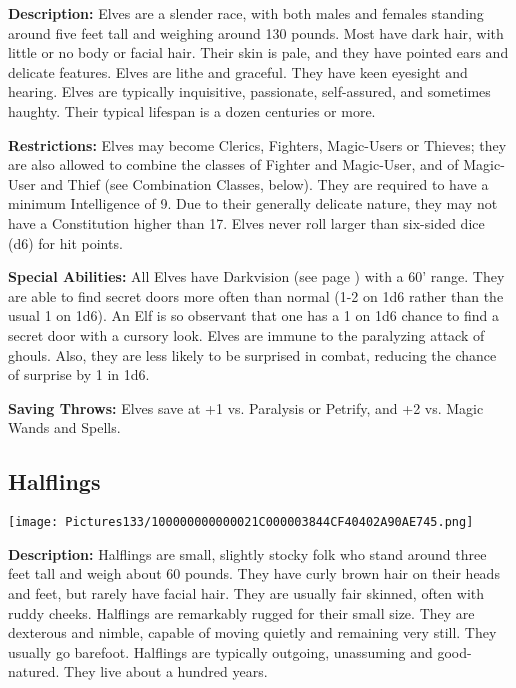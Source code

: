 \documentclass[a4paper,twoside,openany,10pt]{book}
\begin{document}
\begin{multicols}{2}
\textbf{Description:}
Elves are a slender race, with both males and females standing around five feet tall and weighing around 130 pounds. Most have dark hair, with little or no body or facial hair. Their skin is pale, and they have pointed ears and delicate features. Elves are lithe and graceful. They have keen eyesight and hearing. Elves are typically inquisitive, passionate, self-assured, and sometimes haughty. Their typical lifespan is a dozen centuries or more.

\textbf{Restrictions: } Elves may become Clerics, Fighters, Magic-Users or Thieves; they are also allowed to combine the classes of Fighter and Magic-User, and of Magic-User and Thief (see Combination Classes, below). They are required to have a minimum Intelligence of 9. Due to their generally delicate nature, they may not have a Constitution higher than 17. Elves never roll larger than six-sided dice (d6) for hit points.

\textbf{Special Abilities: }All Elves have Darkvision (see page \hyperlink{darkvision}{\pageref{darkvision}}) with a 60'{} range. They are able to find secret doors more often than normal (1-2 on 1d6 rather than the usual 1 on 1d6). An Elf is so observant that one has a 1 on 1d6 chance to find a secret door with a cursory look. Elves are immune to the paralyzing attack of ghouls. Also, they are less likely to be surprised in combat, reducing the chance of surprise by 1 in 1d6.

\textbf{Saving Throws: } Elves save at +1 vs. Paralysis or Petrify, and
+2 vs. Magic Wands and Spells.

\subsection{Halflings}\label{halflings}

\begin{center}
	\texttt{[image: Pictures133/100000000000021C000003844CF40402A90AE745.png]}
\end{center}\medskip

\textbf{Description:}
Halflings are small, slightly stocky folk who stand around three feet tall and weigh about 60 pounds. They have curly brown hair on their heads and feet, but rarely have facial hair. They are usually fair skinned, often with ruddy cheeks. Halflings are remarkably rugged for their small size. They are dexterous and nimble, capable of moving quietly and remaining very still. They usually go barefoot. Halflings are typically outgoing, unassuming and good-natured. They live about a hundred years.


\end{multicols}
\end{document}
